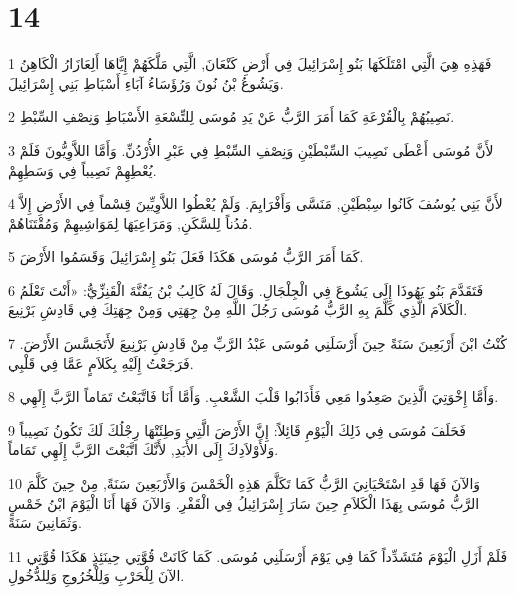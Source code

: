\chapter{14}

\par 1 فَهَذِهِ هِيَ الَّتِي امْتَلَكَهَا بَنُو إِسْرَائِيلَ فِي أَرْضِ كَنْعَانَ, الَّتِي مَلَّكَهُمْ إِيَّاهَا أَلِعَازَارُ الْكَاهِنُ وَيَشُوعُ بْنُ نُونَ وَرُؤَسَاءُ آبَاءِ أَسْبَاطِ بَنِي إِسْرَائِيلَ.
\par 2 نَصِيبُهُمْ بِالْقُرْعَةِ كَمَا أَمَرَ الرَّبُّ عَنْ يَدِ مُوسَى لِلتِّسْعَةِ الأَسْبَاطِ وَنِصْفِ السِّبْطِ.
\par 3 لأَنَّ مُوسَى أَعْطَى نَصِيبَ السِّبْطَيْنِ وَنِصْفِ السِّبْطِ فِي عَبْرِ الأُرْدُنِّ. وَأَمَّا اللاَّوِيُّونَ فَلَمْ يُعْطِهِمْ نَصِيباً فِي وَسَطِهِمْ.
\par 4 لأَنَّ بَنِي يُوسُفَ كَانُوا سِبْطَيْنِ, مَنَسَّى وَأَفْرَايِمَ. وَلَمْ يُعْطُوا اللاَّوِيِّينَ قِسْماً فِي الأَرْضِ إِلاَّ مُدُناً لِلسَّكَنِ, وَمَرَاعِيَهَا لِمَوَاشِيهِمْ وَمُقْتَنَاهُمْ.
\par 5 كَمَا أَمَرَ الرَّبُّ مُوسَى هَكَذَا فَعَلَ بَنُو إِسْرَائِيلَ وَقَسَمُوا الأَرْضَ.
\par 6 فَتَقَدَّمَ بَنُو يَهُوذَا إِلَى يَشُوعَ فِي الْجِلْجَالِ. وَقَالَ لَهُ كَالِبُ بْنُ يَفُنَّةَ الْقَنِزِّيُّ: «أَنْتَ تَعْلَمُ الْكَلاَمَ الَّذِي كَلَّمَ بِهِ الرَّبُّ مُوسَى رَجُلَ اللَّهِ مِنْ جِهَتِي وَمِنْ جِهَتِكَ فِي قَادِشِ بَرْنِيعَ.
\par 7 كُنْتُ ابْنَ أَرْبَعِينَ سَنَةً حِينَ أَرْسَلَنِي مُوسَى عَبْدُ الرَّبِّ مِنْ قَادِشِ بَرْنِيعَ لأَتَجَسَّسَ الأَرْضَ. فَرَجَعْتُ إِلَيْهِ بِكَلاَمٍ عَمَّا فِي قَلْبِي.
\par 8 وَأَمَّا إِخْوَتِيَ الَّذِينَ صَعِدُوا مَعِي فَأَذَابُوا قَلْبَ الشَّعْبِ. وَأَمَّا أَنَا فَاتَّبَعْتُ تَمَاماً الرَّبَّ إِلَهِي.
\par 9 فَحَلَفَ مُوسَى فِي ذَلِكَ الْيَوْمِ قَائِلاً: إِنَّ الأَرْضَ الَّتِي وَطِئَتْهَا رِجْلُكَ لَكَ تَكُونُ نَصِيباً وَلأَوْلاَدِكَ إِلَى الأَبَدِ, لأَنَّكَ اتَّبَعْتَ الرَّبَّ إِلَهِي تَمَاماً.
\par 10 وَالآنَ فَهَا قَدِ اسْتَحْيَانِيَ الرَّبُّ كَمَا تَكَلَّمَ هَذِهِ الْخَمْسَ وَالأَرْبَعِينَ سَنَةً, مِنْ حِينَ كَلَّمَ الرَّبُّ مُوسَى بِهَذَا الْكَلاَمِ حِينَ سَارَ إِسْرَائِيلُ فِي الْقَفْرِ. وَالآنَ فَهَا أَنَا الْيَوْمَ ابْنُ خَمْسٍ وَثَمَانِينَ سَنَةً.
\par 11 فَلَمْ أَزَلِ الْيَوْمَ مُتَشَدِّداً كَمَا فِي يَوْمَ أَرْسَلَنِي مُوسَى. كَمَا كَانَتْ قُوَّتِي حِينَئِذٍ هَكَذَا قُوَّتِي الآنَ لِلْحَرْبِ وَلِلْخُرُوجِ وَلِلدُّخُولِ.
